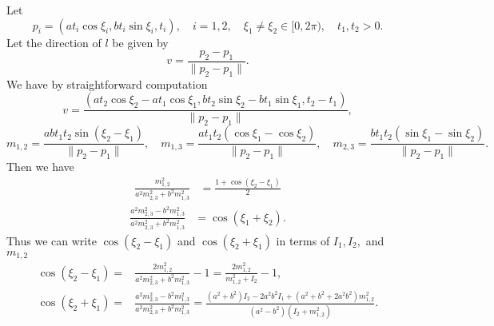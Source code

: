 \documentclass[12pt]{article}
\begin{document}
Let 
$$ 
p_i = (a t_i \cos \xi_i, b t_i \sin \xi_i, t_i),
\quad  i=1,2,
\quad \xi_1\neq \xi_2 \in [0, 2\pi), 
\quad t_1, t_2 > 0.
$$
Let the direction of $l$ be given by 
$$
 v= \frac{p_2-p_1}{\| p_2-p_1 \|}.
$$
We have by straightforward computation 
$$
v= \frac{ \left(
  a t_2 \cos \xi_2-a t_1 \cos \xi_1  ,
  b t_2 \sin \xi_2-b t_1 \sin \xi_1 ,
  t_2 - t_1 \right)}
  {\| p_2-p_1 \|},
$$
\begin{equation}\label{eq:mijs}
m_{1,2} 
= \frac{a b t_1 t_2 \sin{\left(\xi_2 - \xi_1\right)}}
{\| p_2-p_1 \|},\quad
m_{1,3} 
= \frac{a t_1 t_2 \left(\cos{\xi_1} - \cos{\xi_2}\right)}
{\| p_2-p_1 \|},\quad 
m_{2,3} 
=\frac{b t_1 t_2 \left(\sin{\xi_1} - \sin{\xi_2}\right)}
{\| p_2-p_1 \|}.
\end{equation}
Then we have
\begin{equation*}
\begin{split}
\frac{m_{1,2}^2}{ a^2 m_{2,3}^2 + b^2 m_{1,3}^2} 
&= \frac{1 + \cos \left(\xi_2 - \xi_1\right)}{2}
\end{split}
\end{equation*}
\begin{equation*}
  \begin{split}
  \frac{a^2 m_{2,3}^2 - b^2 m_{1,3}^2}{ a^2 m_{2,3}^2 + b^2 m_{1,3}^2} 
  &= \cos \left(\xi_1 + \xi_2\right).
  \end{split}
  \end{equation*}
Thus we can write $\cos\left(\xi_2 - \xi_1\right) $ and $\cos\left(\xi_2 + \xi_1\right) $
in terms of $I_1, I_2,$ and $m_{1,2}$
\begin{align}
  \label{eq:angle-to-integral1}
  \cos\left(\xi_2 - \xi_1\right) 
  =&  \frac{  2 m_{1,2}^2}{ a^2 m_{2,3}^2 + b^2 m_{1,3}^2} -1 = \frac{2 m_{1,2}^2}{m_{1,2}^2 + I_2}-1,\\
  \label{eq:angle-to-integral2}
  \cos\left(\xi_2 + \xi_1\right) 
  =& \frac{  a^2 m_{2,3}^2 - b^2 m_{1,3}^2}{ a^2 m_{2,3}^2 + b^2 m_{1,3}^2}  
=\frac{(a^2 + b^2)I_2 - 2 a^2 b^2 I_1 + (a^2+b^2 + 2a^2b^2) m_{1,2}^2}{(a^2- b^2 )(I_2 + m_{1,2}^2)}.
\end{align}
\end{document}
